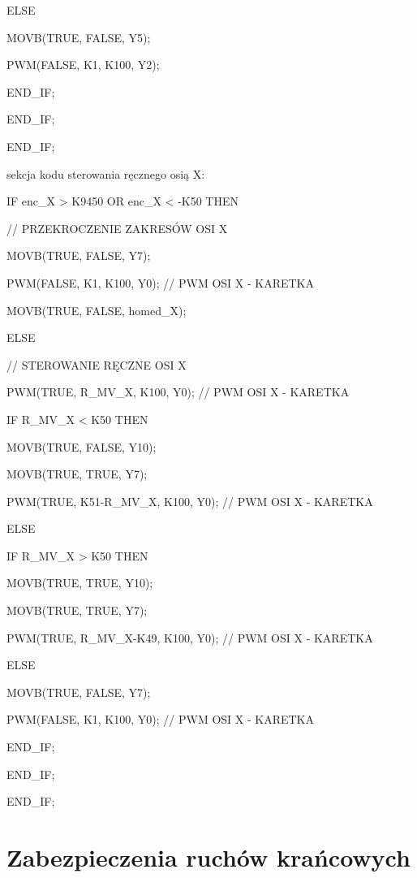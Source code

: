 \documentclass{mwrep}
\begin{document}
\quad \quad \quad \quad ELSE

\quad \quad \quad \quad MOVB(TRUE, FALSE, Y5);

\quad \quad \quad \quad PWM(FALSE, K1, K100, Y2); 

\quad \quad \quad END\_IF;

\quad \quad END\_IF;

\quad END\_IF;

sekcja kodu sterowania ręcznego osią X:

\quad IF enc\_X > K9450 OR enc\_X < -K50 THEN

\quad \quad // PRZEKROCZENIE ZAKRESÓW OSI X

\quad \quad MOVB(TRUE, FALSE, Y7);

\quad \quad PWM(FALSE, K1, K100, Y0); // PWM OSI X - KARETKA

\quad \quad MOVB(TRUE, FALSE, homed\_X);

\quad \quad ELSE\quad 

\quad \quad // STEROWANIE RĘCZNE OSI X\quad 

\quad \quad PWM(TRUE, R\_MV\_X, K100, Y0); // PWM OSI X - KARETKA\quad \quad 

\quad \quad \quad 

\quad \quad IF R\_MV\_X < K50 THEN

\quad \quad MOVB(TRUE, FALSE, Y10);

\quad \quad \quad MOVB(TRUE, TRUE, Y7);

\quad \quad \quad PWM(TRUE, K51-R\_MV\_X, K100, Y0); // PWM OSI X - KARETKA\quad \quad 

\quad \quad \quad ELSE 

\quad \quad \quad IF R\_MV\_X > K50 THEN

\quad \quad \quad \quad MOVB(TRUE, TRUE, Y10);

\quad \quad \quad \quad MOVB(TRUE, TRUE, Y7);

\quad \quad \quad \quad PWM(TRUE, R\_MV\_X-K49, K100, Y0); // PWM OSI X - KARETKA\quad 

\quad \quad \quad \quad ELSE\quad 

\quad \quad \quad \quad MOVB(TRUE, FALSE, Y7);

\quad \quad \quad \quad PWM(FALSE, K1, K100, Y0); // PWM OSI X - KARETKA\quad 

\quad \quad \quad END\_IF;

\quad \quad END\_IF;

\quad END\_IF;


\section{Zabezpieczenia ruchów krańcowych}
\label{PLC::Krancowki}
\end{document}
